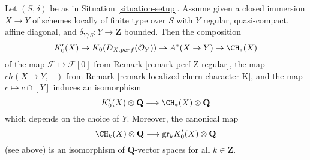 \begin{proposition}
\label{proposition-K-tensor-Q}
Let $(S, \delta)$ be as in Situation \ref{situation-setup}. Assume given a
closed immersion $X \to Y$ of schemes locally of finite type over $S$
with $Y$ regular, quasi-compact, affine diagonal, and
$\delta_{Y/S} : Y \to \mathbf{Z}$ bounded. Then the composition
$$
K'_0(X) \to
K_0(D_{X, perf}(\mathcal{O}_Y)) \to
A^*(X \to Y) \to
\CH_*(X)
$$
of the map $\mathcal{F} \mapsto \mathcal{F}[0]$ from
Remark \ref{remark-perf-Z-regular}, the map $ch(X \to Y, -)$ from
Remark \ref{remark-localized-chern-character-K}, and
the map $c \mapsto c \cap [Y]$ induces an isomorphism
$$
K'_0(X) \otimes \mathbf{Q}
\longrightarrow
\CH_*(X) \otimes \mathbf{Q}
$$
which depends on the choice of $Y$. Moreover, the canonical map
$$
\CH_k(X) \otimes \mathbf{Q}
\longrightarrow
\text{gr}_k K'_0(X) \otimes \mathbf{Q}
$$
(see above) is an isomorphism of $\mathbf{Q}$-vector spaces for all
$k \in \mathbf{Z}$.
\end{proposition}

